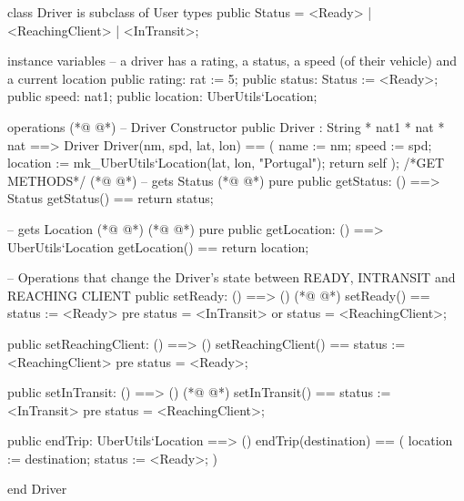\begin{vdmpp}[breaklines=true]
class Driver is subclass of User
types
    public Status = <Ready> | <ReachingClient> | <InTransit>;

instance variables
    -- a driver has a rating, a status, a speed (of their vehicle) and a current location
    public rating: rat := 5;
    public status: Status := <Ready>;
    public speed: nat1;
    public location: UberUtils`Location;

operations
(*@
\label{Driver:13}
@*)
  -- Driver Constructor
    public Driver : String * nat1 * nat * nat ==> Driver
        Driver(nm, spd, lat, lon) == (
            name := nm;
            speed := spd;
            location := mk_UberUtils`Location(lat, lon, "Portugal");
            return self
        );
    /*GET METHODS*/
(*@
\label{setReady:22}
@*)
  -- gets Status
(*@
\label{getStatus:23}
@*)
  pure public getStatus: () ==> Status
  getStatus() == return status;
  
   -- gets Location
(*@
\label{getLocation:27}
@*)
(*@
\label{setReachingClient:27}
@*)
  pure public getLocation: () ==> UberUtils`Location
  getLocation() == return location;
  
    -- Operations that change the Driver's state between READY, INTRANSIT and REACHING CLIENT
    public setReady: () ==> ()
(*@
\label{setInTransit:32}
@*)
        setReady() ==
            status := <Ready>
            pre status = <InTransit> or status = <ReachingClient>;
        
    public setReachingClient: () ==> ()
        setReachingClient() ==
            status := <ReachingClient>
            pre status = <Ready>;
    
    public setInTransit: () ==> ()
(*@
\label{endTrip:42}
@*)
        setInTransit() ==
            status := <InTransit>
            pre status = <ReachingClient>;
    
    public endTrip: UberUtils`Location ==> ()
      endTrip(destination) == (
        location := destination;
        status := <Ready>;
      )

end Driver
\end{vdmpp}
